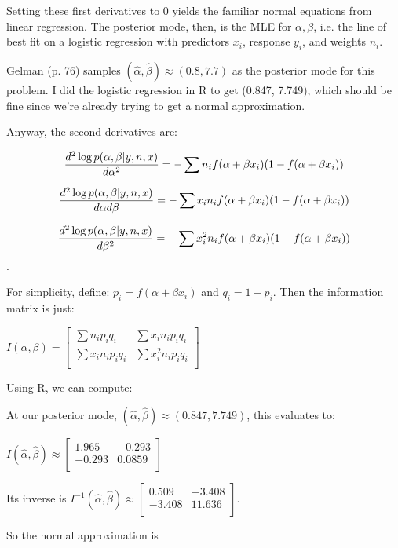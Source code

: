 \documentclass{article}
\begin{document}
Setting these first derivatives to 0 yields the familiar normal equations 
from linear regression. The posterior mode, then, is the MLE
for \(\alpha, \beta\), i.e. the line of best fit on a logistic regression with predictors \(x_i\), 
response \(y_i\), and weights \(n_i\).

Gelman (p. 76) samples \((\hat{\alpha}, \hat{\beta}) \approx (0.8, 7.7)\)
as the posterior mode for this problem. I did the logistic regression in 
R to get (0.847, 7.749), which should be fine since we're already
trying to get a normal approximation.

Anyway, the second derivatives are:

\[{d^2 \log p(\alpha, \beta \vert y, n, x) \over d\alpha^2} = 
-\sum n_i f(\alpha + \beta x_i) (1 - f(\alpha + \beta x_i))\]

\[{d^2 \log p(\alpha, \beta \vert y, n, x) \over d\alpha d\beta} = 
-\sum x_i n_i f(\alpha + \beta x_i) (1 - f(\alpha + \beta x_i))\]

\[{d^2 \log p(\alpha, \beta \vert y, n, x) \over d\beta^2} = 
-\sum x_i^2 n_i f(\alpha + \beta x_i) (1 - f(\alpha + \beta x_i)) \].

For simplicity, define:
\(p_i = f(\alpha + \beta x_i)\) and \(q_i = 1 - p_i\). Then the information matrix is just:

\( I(\alpha, \beta) = 
\begin{bmatrix*}
  \sum n_i p_i q_i & \sum x_i n_i p_i q_i  \\
\sum x_i n_i p_i q_i & \sum x_i^2 n_i p_i q_i \\
 \end{bmatrix*}
\)

Using R, we can compute:

At our posterior mode, \((\hat{\alpha}, \hat{\beta}) \approx (0.847, 7.749)\),
this evaluates to:

\( I(\hat{\alpha}, \hat{\beta}) \approx
\begin{bmatrix*}
  1.965 & -0.293  \\
  -0.293 & 0.0859 \\
 \end{bmatrix*}
\)

Its inverse is
\( I^{-1}(\hat{\alpha}, \hat{\beta}) \approx
\begin{bmatrix*}
  0.509 & -3.408 \\
 -3.408 & 11.636 \\
 \end{bmatrix*}
\).

So the normal approximation is
\end{document}
